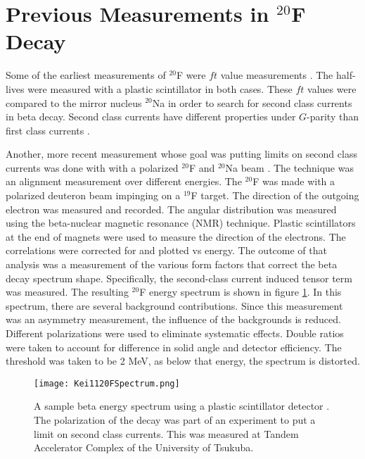 \documentclass[../MaxHughesThesis.tex]{subfiles}
\begin{document}
\section{Previous Measurements in $^{20}$F Decay}

Some of the earliest measurements of $^{20}$F were $ft$ value measurements \cite{Wil70} \cite{Alb75}.
The half-lives were measured with a plastic scintillator in both cases.  
These $ft$ values were compared to the mirror nucleus $^{20}$Na in order to search for second class currents in beta decay.
Second class currents have different properties under $G$-parity than first class currents \cite{Wei58}.

Another, more recent measurement whose goal was putting limits on second class currents was done with with a polarized $^{20}$F and $^{20}$Na beam \cite{Min11}.
The technique was an alignment measurement over different energies.
The $^{20}$F was made with a polarized deuteron beam impinging on a $^{19}$F target. 
The direction of the outgoing electron was measured and recorded.
The angular distribution was measured using the beta-nuclear magnetic resonance (NMR) technique.
Plastic scintillators at the end of magnets were used to measure the direction of the electrons.
The correlations were corrected for and plotted vs energy.
The outcome of that analysis was a measurement of the various form factors that correct the beta decay spectrum shape. 
Specifically, the second-class current induced tensor term was measured.
The resulting $^{20}$F energy spectrum is shown in figure \ref{fig:keispec}.
In this spectrum, there are several background contributions. 
Since this measurement  was an asymmetry measurement, the influence of the backgrounds is reduced. 
Different polarizations were used to eliminate systematic effects.
Double ratios were taken to account for difference in solid angle and detector efficiency.
The threshold was taken to be 2 MeV, as below that energy, the spectrum is distorted.

\begin{figure}[!htb]
	\centerline{\texttt{[image: Kei1120FSpectrum.png]}}
	\caption{A sample beta energy spectrum using a plastic scintillator detector \cite{Min11}.
		 The polarization of the decay was part of an experiment to put a limit on second class currents.
		 This was measured at Tandem Accelerator Complex of the University of Tsukuba.
		 } 
	\label{fig:keispec}
\end{figure}
\end{document}
